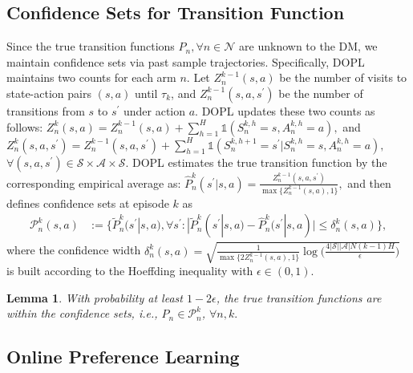 \documentclass{article} %
\newcommand{\DOPL}{\textsc{DOPL}\xspace}
\newcommand{\cA}{\mathcal{A}}
\newcommand{\cS}{\mathcal{S}}
\newcommand{\cN}{\mathcal{N}}
\newtheorem{lemma}{Lemma}
\begin{document}
\subsection{Confidence Sets for Transition Function}\label{sec:estimated-transition}
Since the true transition functions $P_n, \forall n\in\cN$ are unknown to the DM, we maintain confidence sets via past sample trajectories. Specifically, \DOPL maintains two counts for each arm $n$.  Let $Z_n^{k-1}(s,a)$ be the number of visits to state-action pairs $(s,a)$ until $\tau_k$, and $Z_n^{k-1}(s,a, s^\prime)$ be the number of transitions from $s$ to $s^\prime$ under action $a$. \DOPL updates these two counts as follows: 
$Z_n^{k}(s,a)=Z_n^{k-1}(s,a)+\sum_{h=1}^{H}\mathds{1}(S_n^{k,h}=s,A_n^{k,h}=a),$
  and  $Z_n^{k}(s,a, s^\prime)=Z_n^{k-1}(s,a, s^\prime)+\sum_{h=1}^{H}\mathds{1}(S_n^{k,h+1}=s^\prime|S_n^{k,h}=s,A_n^{k,h}=a),$ $\forall (s,a,s^\prime)\in\mathcal{S}\times\mathcal{A}\times\mathcal{S}.$
\DOPL estimates the true transition function by the corresponding empirical average as: $\hat{P}_n^{k}(s^\prime|s,a)=\frac{Z_n^{k-1}(s,a,s^\prime)}{\max\{Z_n^{k-1}(s,a),1\}},$
and then defines confidence sets at episode $k$ as 
\begin{align}\label{eq:confidence_ball} 
 \mathcal{P}_n^{k}(s,a)&:=\{\tilde{P}_n^k(s^\prime|s,a),\forall s^\prime:|\tilde{P}_n^k(s^\prime|s,\!a)-\hat{P}_n^{k}(s^\prime|s,a)|\leq \delta_n^{k}(s,a)\},
\end{align}
where the confidence width $\delta_n^{k}(s,a)={\sqrt{\frac{1}{\max\{2Z_n^{k-1}(s,a), 1\}}\log\Big(\frac{4|\cS||\cA|N(k-1)H}{\epsilon}\Big)}}$ is built according to the Hoeffding inequality \citep{hoeffding1994probability} with $\epsilon\in(0,1)$.


\begin{lemma}\label{lemma:good_set}
With probability at least $1-2\epsilon$, the true transition functions are within the confidence sets, i.e., $P_n\in \mathcal{P}_n^{k}$, $\forall n, k.$
\end{lemma}



\subsection{Online Preference Learning} \label{sec:estimated-preference}
\end{document}
